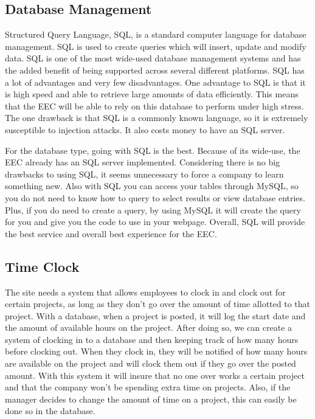 \documentclass[letterpaper,10pt,titlepage,journal,compsoc,draftclsnofoot,onecolumn]{IEEEtran}
\begin{document}
\subsection{Database Management}

\par Structured Query Language, SQL, is a standard computer language for database management. SQL is used to create queries which will insert, update and modify data. SQL is one of the most wide-used database management systems and has the added benefit of being supported across several different platforms. SQL has a lot of advantages and very few disadvantages. One advantage to SQL is that it is high speed and able to retrieve large amounts of data efficiently. This means that the EEC will be able to rely on this database to perform under high stress. The one drawback is that SQL is a commonly known language, so it is extremely susceptible to injection attacks. It also costs money to have an SQL server.\newline
\par For the database type, going with SQL is the best. Because of its wide-use, the EEC already has an SQL server implemented. Considering there is no big drawbacks to using SQL, it seems unnecessary to force a company to learn something new. Also with SQL you can access your tables through MySQL, so you do not need to know how to query to select results or view database entries. Plus, if you do need to create a query, by using MySQL it will create the query for you and give you the code to use in your webpage. Overall, SQL will provide the best service and overall best experience for the EEC. 

\subsection{Time Clock}

\par The site needs a system that allows employees to clock in and clock out for certain projects, as long as they don't go over the amount of time allotted to that project. With a database, when a project is posted, it will log the start date and the amount of available hours on the project. After doing so, we can create a system of clocking in to a database and then keeping track of how many hours before clocking out. When they clock in, they will be notified of how many hours are available on the project and will clock them out if they go over the posted amount. With this system it will insure that no one over works a certain project and that the company won't be spending extra time on projects. Also, if the manager decides to change the amount of time on a project, this can easily be done so in the database. \newline
\end{document}

